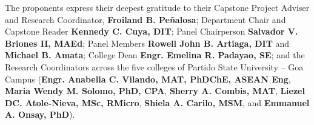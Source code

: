 \documentclass[sigplan,screen,nonacm]{acmart}
\begin{document}
\begin{acks}
The proponents express their deepest gratitude to their Capstone Project Adviser and Research Coordinator, \textbf{Froiland B. Pe\~{n}alosa}; Department Chair and Capstone Reader \textbf{Kennedy C. Cuya, DIT}; Panel Chairperson \textbf{Salvador V. Briones II, MAEd}; Panel Members \textbf{Rowell John B. Artiaga, DIT} and \textbf{Michael B. Amata}; College Dean \textbf{Engr. Emelina R. Padayao, SE}; and the Research Coordinators across the five colleges of Partido State University -- Goa Campus (\textbf{Engr. Anabella C. Vilando, MAT, PhDChE, ASEAN Eng}, \textbf{Maria Wendy M. Solomo, PhD, CPA}, \textbf{Sherry A. Combis, MAT}, \textbf{Liezel DC. Atole-Nieva, MSc, RMicro}, \textbf{Shiela A. Carilo, MSM}, and \textbf{Emmanuel A. Onsay, PhD}).
\end{acks}



\end{document}
